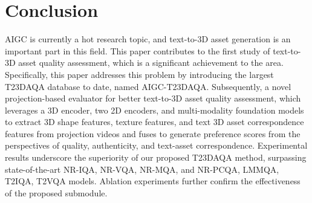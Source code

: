\section{Conclusion}
AIGC is currently a hot research topic, and text-to-3D asset generation is an important part in this field. This paper contributes to the first study of text-to-3D asset quality assessment, which is a significant achievement to the area. Specifically, this paper addresses this problem by introducing the largest T23DAQA database to date, named AIGC-T23DAQA. Subsequently, a novel projection-based evaluator for better text-to-3D asset quality assessment, which leverages a 3D encoder, two 2D encoders, and multi-modality foundation models to extract 3D shape features, texture features, and text 3D asset correspondence features from projection videos and fuses to generate preference scores from the perspectives of quality, authenticity, and text-asset correspondence. Experimental results underscore the superiority of our proposed T23DAQA method, surpassing state-of-the-art NR-IQA, NR-VQA, NR-MQA, and NR-PCQA, LMMQA, T2IQA, T2VQA models. Ablation experiments further confirm the effectiveness of the proposed submodule.
